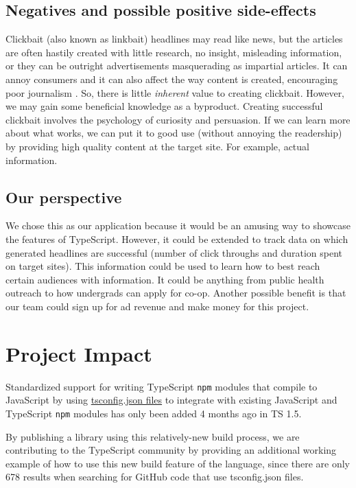 \documentclass[]{article}
\begin{document}
\subsection{Negatives and possible positive
side-effects}\label{negatives-and-possible-positive-side-effects}

Clickbait (also known as linkbait) headlines may read like news, but the
articles are often hastily created with little research, no insight,
misleading information, or they can be outright advertisements
masquerading as impartial articles. It can annoy consumers
\cite{ref8} and it can also affect the way content is
created, encouraging poor journalism \cite{ref9}. So, there
is little \emph{inherent} value to creating clickbait. However, we may
gain some beneficial knowledge as a byproduct. Creating successful
clickbait involves the psychology of curiosity and persuasion. If we can
learn more about what works, we can put it to good use (without annoying
the readership) by providing high quality content at the target site.
For example, actual information.

\subsection{Our perspective}\label{our-perspective}

We chose this as our application because it would be an amusing way to
showcase the features of TypeScript. However, it could be extended to
track data on which generated headlines are successful (number of click
throughs and duration spent on target sites). This information could be
used to learn how to best reach certain audiences with information. It
could be anything from public health outreach to how undergrads can
apply for co-op. Another possible benefit is that our team could sign up
for ad revenue and make money for this project.

\section{Project Impact}\label{project-impact}

Standardized support for writing TypeScript \texttt{npm} modules that
compile to JavaScript by using
\href{https://github.com/Microsoft/TypeScript/wiki/tsconfig.json}{tsconfig.json
files} to integrate with existing JavaScript and TypeScript \texttt{npm}
modules has only been added 4 months ago in TS 1.5.
\cite{ref4}

By publishing a library using this relatively-new build process, we are
contributing to the TypeScript community by providing an additional
working example of how to use this new build feature of the language,
since there are only 678 results \cite{ref10} when
searching for GitHub code that use tsconfig.json files.
\end{document}

